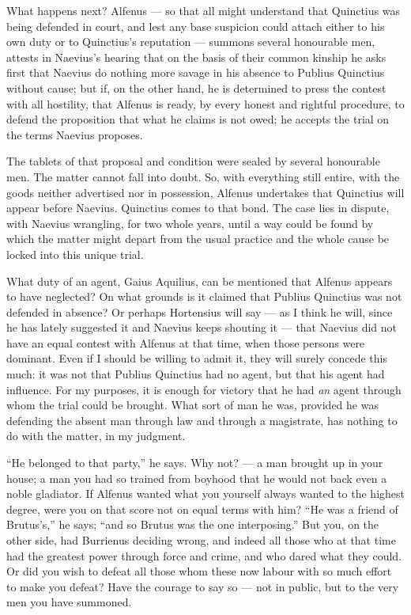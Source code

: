  What happens next? Alfenus --- so that all might understand that Quinctius was being defended in court, and lest any base suspicion could attach either to his own duty or to Quinctius's reputation --- summons several honourable men, attests in Naevius's hearing that on the basis of their common kinship he asks first that Naevius do nothing more savage in his absence to Publius Quinctius without cause; but if, on the other hand, he is determined to press the contest with all hostility, that Alfenus is ready, by every honest and rightful procedure, to defend the proposition that what he claims is not owed; he accepts the trial on the terms Naevius proposes.

 The tablets of that proposal and condition were sealed by several honourable men. The matter cannot fall into doubt. So, with everything still entire, with the goods neither advertised nor in possession, Alfenus undertakes that Quinctius will appear before Naevius. Quinctius comes to that bond. The case lies in dispute, with Naevius wrangling, for two whole years, until a way could be found by which the matter might depart from the usual practice and the whole cause be locked into this unique trial.

 What duty of an agent, Gaius Aquilius, can be mentioned that Alfenus appears to have neglected? On what grounds is it claimed that Publius Quinctius was not defended in absence? Or perhaps Hortensius will say --- as I think he will, since he has lately suggested it and Naevius keeps shouting it --- that Naevius did not have an equal contest with Alfenus at that time, when those persons were dominant. Even if I should be willing to admit it, they will surely concede this much: it was not that Publius Quinctius had no agent, but that his agent had influence. For my purposes, it is enough for victory that he had \emph{an} agent through whom the trial could be brought. What sort of man he was, provided he was defending the absent man through law and through a magistrate, has nothing to do with the matter, in my judgment.

 ``He belonged to that party,'' he says. Why not? --- a man brought up in your house; a man you had so trained from boyhood that he would not back even a noble gladiator. If Alfenus wanted what you yourself always wanted to the highest degree, were you on that score not on equal terms with him? ``He was a friend of Brutus's,'' he says; ``and so Brutus was the one interposing.'' But you, on the other side, had Burrienus deciding wrong, and indeed all those who at that time had the greatest power through force and crime, and who dared what they could. Or did you wish to defeat all those whom these now labour with so much effort to make you defeat? Have the courage to say so --- not in public, but to the very men you have summoned.

